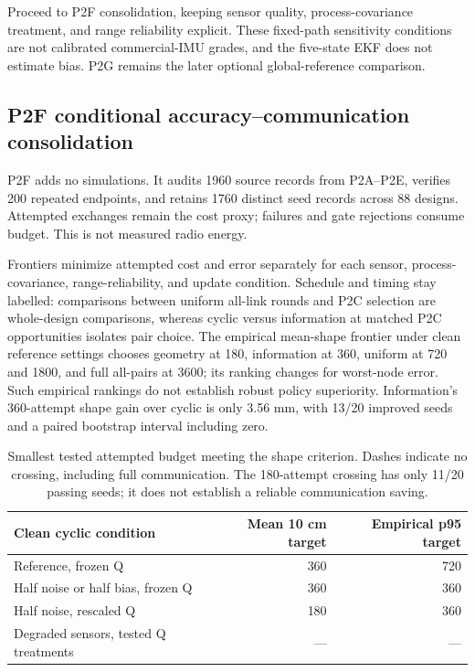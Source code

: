Proceed to P2F consolidation, keeping sensor quality, process-covariance treatment, and range reliability explicit. These fixed-path sensitivity conditions are not calibrated commercial-IMU grades, and the five-state EKF does not estimate bias. P2G remains the later optional global-reference comparison.


\subsection{P2F conditional accuracy--communication consolidation}
P2F adds no simulations. It audits 1960 source records from P2A--P2E, verifies 200 repeated endpoints, and retains 1760 distinct seed records across 88 designs. Attempted exchanges remain the cost proxy; failures and gate rejections consume budget. This is not measured radio energy.

Frontiers minimize attempted cost and error separately for each sensor, process-covariance, range-reliability, and update condition. Schedule and timing stay labelled: comparisons between uniform all-link rounds and P2C selection are whole-design comparisons, whereas cyclic versus information at matched P2C opportunities isolates pair choice. The empirical mean-shape frontier under clean reference settings chooses geometry at 180, information at 360, uniform at 720 and 1800, and full all-pairs at 3600; its ranking changes for worst-node error. Such empirical rankings do not establish robust policy superiority. Information's 360-attempt shape gain over cyclic is only 3.56 mm, with 13/20 improved seeds and a paired bootstrap interval including zero.

\begin{table}[htbp]
\centering\small
\begin{tabular}{lrr}
\toprule
Clean cyclic condition & Mean 10 cm target & Empirical p95 target\\
\midrule
Reference, frozen Q & 360 & 720\\
Half noise or half bias, frozen Q & 360 & 360\\
Half noise, rescaled Q & 180 & 360\\
Degraded sensors, tested Q treatments & --- & ---\\
\bottomrule
\end{tabular}
\caption{Smallest tested attempted budget meeting the shape criterion. Dashes indicate no crossing, including full communication. The 180-attempt crossing has only 11/20 passing seeds; it does not establish a reliable communication saving.}
\end{table}

